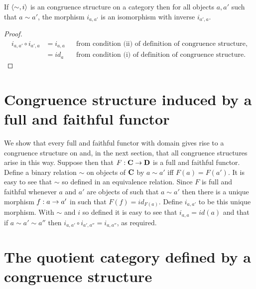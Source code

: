 \documentclass[10pt,a4paper]{article}
\theoremstyle{remark}
\begin{document}
\begin{lemma}
If $\langle\sim,i\rangle$ is an congruence structure on a category \catcw then
for all objects $a,a'$ such that $a \sim a'$, the morphism $i_{a,a'}$ is an isomorphism with inverse $i_{a',a}$.
\end{lemma}
\begin{proof}
\begin{align*}
i_{a,a'} \circ i_{a',a} &= i_{a,a} &&\mbox{from condition (ii) of definition of congruence structure}, \\
                        &= id_a    &&\mbox{from condition (i) of definition of congruence structure}.
\end{align*}
\end{proof}

\section{Congruence structure induced by a full and faithful functor}
We show that every full and faithful functor with domain \catcw gives rise to a congruence structure on \catcw
and, in the next section, that all congruence structures arise in this way.
Suppose then that $F:\textbf{C} \rightarrow \textbf{D}$ is  a full and faithful functor. 
Define a binary relation $\sim$ on objects of $\textbf{C}$ by $a \sim a'$ iff $F(a) = F(a')$. It is easy to see that $\sim$ so defined in an equivalence relation. Since $F$ is full and faithful 
whenever $a$ and $a'$ are objects of \catcw such that $a \sim a'$ then there is a unique morphism 
$f:a \rightarrow a'$ in \catcw such that $F(f)=id_{F(a)}$. Define $i_{a,a'}$ to be this 
unique morphism. With $\sim$ and $i$ so defined it is easy to see that
$i_{a,a}=id(a)$ and that if $a \sim a' \sim a''$ then $i_{a,a'} \circ i_{a',a''}=i_{a,a''}$, as required.  

\section{The quotient category defined by a congruence structure}
\end{document}
